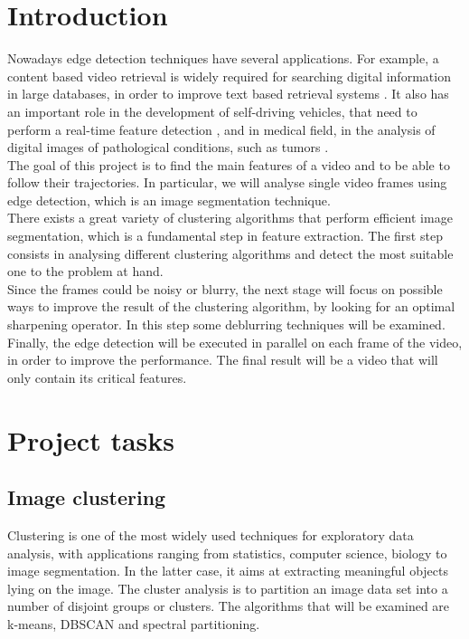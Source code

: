 \documentclass[11pt]{article}
\begin{document}
\section*{Introduction}
Nowadays edge detection techniques have several applications. For example,  a content based video retrieval is widely required for searching digital information in large databases, in order to improve text based retrieval systems \cite{1}. It also has an important role in the development of self-driving vehicles, that need to perform a real-time feature detection \cite{2}, and in medical field, in the analysis of digital images of pathological conditions, such as tumors \cite{3}.    \\
The goal of this project is to find the main features of a video and to be able to follow their trajectories. In particular, we will analyse single video frames using edge detection, which is an image segmentation technique.  \\
There exists a great variety of clustering algorithms that perform efficient image segmentation, which is a fundamental step in feature extraction.  The first step consists in analysing different clustering algorithms and detect the most suitable one to the problem at hand. \\
Since the frames could be noisy or blurry, the next stage will focus on possible ways to improve the result of the clustering algorithm, by looking for an optimal sharpening operator. In this step some deblurring techniques will be examined. \\
Finally, the edge detection will be executed in parallel on each frame of the video, in order to improve the performance. The final result will be a video that will only contain its critical features. 

\newpage
\section{Project tasks}
\subsection{Image clustering}
Clustering is one of the most widely used techniques for exploratory data analysis, with applications ranging from statistics, computer science, biology to image segmentation. In the latter case, it aims at extracting meaningful objects lying on the image. The cluster analysis is to partition an image data set into a number of disjoint groups or clusters. The  algorithms that will be examined are k-means, DBSCAN and spectral partitioning. 
\end{document}
